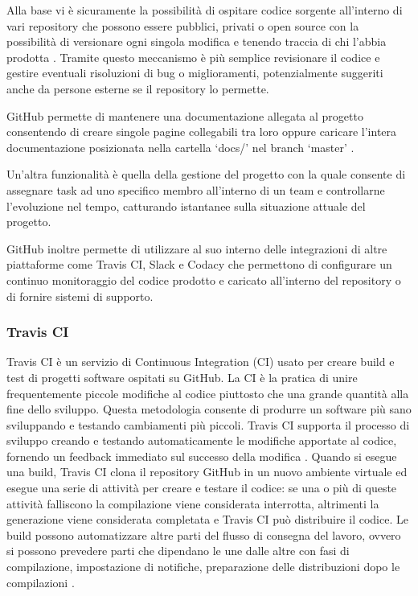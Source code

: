 Alla base vi è sicuramente la possibilità di ospitare codice sorgente all'interno di vari repository che possono essere pubblici, privati o open source con la possibilità di versionare ogni singola modifica e tenendo traccia di chi l'abbia prodotta \footnotemark.
Tramite questo meccanismo è più semplice revisionare il codice e gestire eventuali risoluzioni di bug o miglioramenti, potenzialmente suggeriti anche da persone esterne se il repository lo permette.

GitHub permette di mantenere una documentazione allegata al progetto consentendo di creare singole pagine collegabili tra loro oppure caricare l'intera documentazione posizionata nella cartella `docs/' nel branch `master' \footnotemark[\value{footnote}].

Un'altra funzionalità è quella della gestione del progetto con la quale consente di assegnare task ad uno specifico membro all'interno di un team e controllarne l'evoluzione nel tempo, catturando istantanee sulla situazione attuale del progetto.

GitHub inoltre permette di utilizzare al suo interno delle integrazioni di altre piattaforme come Travis CI,  Slack e Codacy che permettono di configurare un continuo monitoraggio del codice prodotto e caricato all'interno del repository o di fornire sistemi di supporto.

\subsubsection{Travis CI}
Travis CI è un servizio di Continuous Integration (CI) usato per creare build e test di progetti software ospitati su GitHub.
La CI è la pratica di unire frequentemente piccole modifiche al codice piuttosto che una grande quantità alla fine dello sviluppo. Questa metodologia consente di produrre un software più sano sviluppando e testando cambiamenti più piccoli.
Travis CI supporta il processo di sviluppo creando e testando automaticamente le modifiche apportate al codice, fornendo un feedback immediato sul successo della modifica \footnotemark.
Quando si esegue una build, Travis CI clona il repository GitHub in un nuovo ambiente virtuale ed esegue una serie di attività per creare e testare il codice: se una o più di queste attività falliscono la compilazione viene considerata interrotta, altrimenti la generazione viene considerata completata e Travis CI può distribuire il codice.
Le build possono automatizzare altre parti del flusso di consegna del lavoro, ovvero si possono prevedere parti che dipendano le une dalle altre con fasi di compilazione, impostazione di notifiche, preparazione delle distribuzioni dopo le compilazioni \footnotemark[\value{footnote}].


